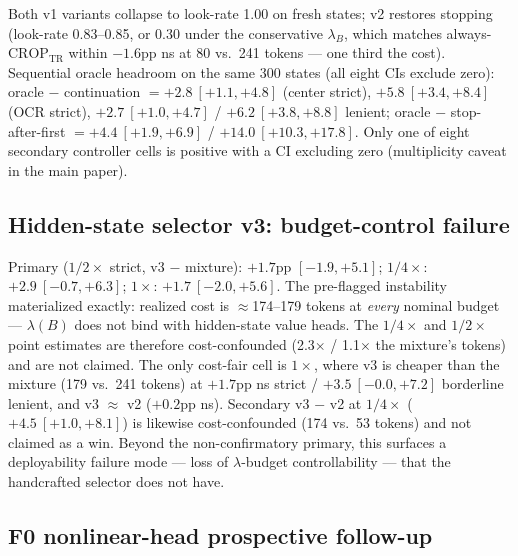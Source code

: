 \documentclass[10pt]{article}
\begin{document}
Both v1 variants collapse to look-rate 1.00 on fresh states; v2 restores
stopping (look-rate 0.83--0.85, or 0.30 under the conservative
$\lambda_B$, which matches always-$\mathrm{CROP}_{\mathrm{TR}}$ within
$-1.6$pp ns at 80 vs.\ 241 tokens --- one third the cost). Sequential
oracle headroom on the same 300 states (all eight CIs exclude zero):
oracle $-$ continuation $= +2.8\ [+1.1,+4.8]$ (center strict),
$+5.8\ [+3.4,+8.4]$ (OCR strict), $+2.7\ [+1.0,+4.7]$ /
$+6.2\ [+3.8,+8.8]$ lenient; oracle $-$ stop-after-first
$= +4.4\ [+1.9,+6.9]$ / $+14.0\ [+10.3,+17.8]$. Only one of eight
secondary controller cells is positive with a CI excluding zero
(multiplicity caveat in the main paper).

\subsection{Hidden-state selector v3: budget-control failure}
\label{sec:results:v3}

Primary ($1/2\times$ strict, v3 $-$ mixture): $+1.7$pp $[-1.9,+5.1]$;
$1/4\times$: $+2.9\ [-0.7,+6.3]$; $1\times$: $+1.7\ [-2.0,+5.6]$. The
pre-flagged instability materialized exactly: realized cost is
$\approx$174--179 tokens at \emph{every} nominal budget --- $\lambda(B)$
does not bind with hidden-state value heads. The $1/4\times$ and
$1/2\times$ point estimates are therefore cost-confounded (2.3$\times$ /
1.1$\times$ the mixture's tokens) and are not claimed. The only cost-fair
cell is $1\times$, where v3 is cheaper than the mixture (179 vs.\ 241
tokens) at $+1.7$pp ns strict / $+3.5\ [-0.0,+7.2]$ borderline lenient,
and v3 $\approx$ v2 ($+0.2$pp ns). Secondary v3 $-$ v2 at $1/4\times$
($+4.5\ [+1.0,+8.1]$) is likewise cost-confounded (174 vs.\ 53 tokens) and
not claimed as a win. Beyond the non-confirmatory primary, this surfaces a
deployability failure mode --- loss of $\lambda$-budget controllability ---
that the handcrafted selector does not have.

\subsection{F0 nonlinear-head prospective follow-up}
\label{sec:results:strong}
\end{document}
